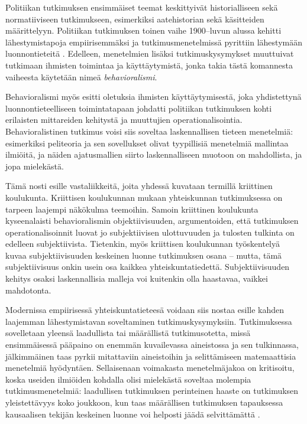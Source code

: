 \documentclass[finnish,gradu,twoside,12pt]{tktltiki}
\begin{document}
Politiikan tutkimuksen ensimmäiset teemat keskittyivät historialliseen sekä normatiiviseen tutkimukseen, esimerkiksi aatehistorian sekä käsitteiden määrittelyyn. Politiikan tutkimuksen toinen vaihe 1900--luvun alussa kehitti lähestymistapoja empiirisemmäksi ja tutkimusmenetelmissä pyrittiin lähestymään luonnontieteitä \citep{historia}. Edelleen, menetelmien lisäksi tutkimuskysymykset muuttuivat tutkimaan ihmisten toimintaa ja käyttäytymistä, jonka takia tästä komannesta vaiheesta käytetään nimeä \textit{behavioralismi}.

Behavioralismi myös esitti oletuksia ihmisten käyttäytymisestä, joka yhdistettynä luonnontieteelliseen toimintatapaan johdatti politiikan tutkimuksen kohti erilaisten mittareiden kehitystä ja muuttujien operationalisointia. Behavioralistinen tutkimus voisi siis soveltaa laskennallisen tieteen menetelmiä: esimerkiksi peliteoria ja sen sovellukset olivat tyypillisiä menetelmiä mallintaa ilmiöitä, ja näiden ajatusmallien siirto laskennalliseen muotoon on mahdollista, ja jopa mielekästä.

Tämä nosti esille vastaliikkeitä, joita yhdessä kuvataan termillä kriittinen koulukunta. Kriittisen koulukunnan mukaan yhteiskunnan tutkimuksessa on tarpeen laajempi näkökulma teemoihin. Samoin kriittinen koulukunta kyseenalaisti behavioralismin objektiivisuuden, argumentoiden, että tutkimuksen operationalisoinnit luovat jo subjektiivisen ulottuvuuden ja tulosten tulkinta on edelleen subjektiivista. Tietenkin, myös kriittisen koulukunnan työskentelyä kuvaa subjektiivisuuden keskeinen luonne tutkimuksen osana -- mutta, tämä subjektiivisuus onkin usein osa kaikkea yhteiskuntatiedettä. Subjektiivisuuden kehitys osaksi laskennallisia malleja voi kuitenkin olla haastavaa, vaikkei mahdotonta.

Modernissa empiirisessä yhteiskuntatieteesä voidaan siis nostaa esille kahden laajemman lähestymistavan soveltaminen tutkimuskysymyksiin. Tutkimuksessa sovelletaan yleensä laadullista tai määrällistä tutkimusotetta, missä ensimmäisessä pääpaino on enemmän kuvailevassa aineistossa ja sen tulkinnassa, jälkimmäinen taas pyrkii mitattaviin aineistoihin ja selittämiseen matemaattisia menetelmiä hyödyntäen. Sellaisenaan voimakasta menetelmäjakoa on kritisoitu, koska useiden ilmiöiden kohdalla olisi mielekästä soveltaa molempia tutkimusmenetelmiä: laadullisen tutkimuksen perinteinen haaste on tutkimuksen yleistettävyys koko joukkoon, kun taas määrällisen tutkimuksen tapauksessa kausaalisen tekijän keskeinen luonne voi helposti jäädä selvittämättä \citep{ragin96,mcgraw96,silverman00}.
\end{document}
